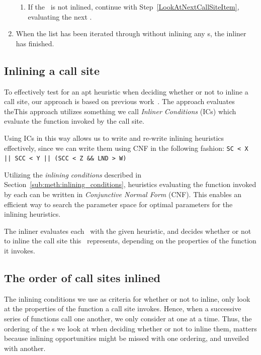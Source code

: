 \begin{enumerate}
\begin{enumerate}
		\item If the \applyNode~is not inlined, continue with
Step~\ref{LookAtNextCallSiteItem}, evaluating the next \applyNode .
		\label{InlineCallSiteItem}
	\end{enumerate}

	\item When the list has been iterated through without inlining any
\applyNode s, the inliner has finished.
\end{enumerate}

\subsection{Inlining a call site}
\label{sub:scheme:inlining_apply_nodes}

To effectively test for an apt heuristic when deciding whether or not to inline
a call site, our approach is based on previous
work~\cite{deshpande2012statically}\cite{AdaptvCompilAndInlingWaterman}. The
approach evaluates theThis
approach utilizes something we call \textit{Inliner Conditions} (ICs) which
evaluate the function invoked by the call site.

Using ICs in this way allows us to write and re-write inlining heuristics
effectively, since we can write them using CNF in the following fashion:
\lstinline"SC < X || SCC < Y || (SCC < Z && LND > W)"

Utilizing the \textit{inlining conditions} described in
Section~\ref{sub:meth:inlining_conditions}, heuristics evaluating the function
invoked by each \applyNode can be written in \textit{Conjunctive Normal Form}
(CNF). This enables an efficient way to search the parameter space for optimal
parameters for the inlining heuristics.

The inliner evaluates each \applyNode~with the given heuristic, and decides
whether or not to inline the call site this \applyNode~represents, depending on
the properties of the function it invokes.


\subsection{The order of call sites inlined}
\label{sub:scheme:ordering_apply_nodes}


The inlining conditions we use as criteria for whether or not to inline, only
look at the properties of the function a call site invokes. Hence, when a
successive series of functions call one another, we only consider at one at a
time. Thus, the ordering of the \applyNode s we look at when deciding whether or
not to inline them, matters because inlining opportunities might be missed with
one ordering, and unveiled with another.


